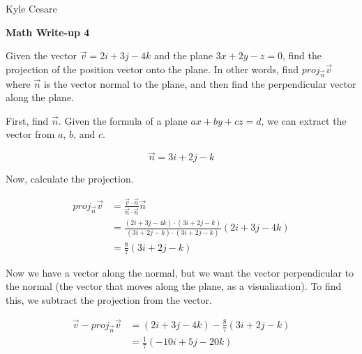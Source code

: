 \documentclass[11pt]{article}
\begin{document}
\begin{flushright}
  Kyle Cesare
\end{flushright}

{\center \textbf{Math Write-up 4} \\}

Given the vector $\vec v = 2i + 3j - 4k$ and the plane $3x + 2y - z = 0$, find
the projection of the position vector onto the plane.  In other words, find
$proj_{\vec n} \vec v$ where $\vec n$ is the vector normal to the plane, and
then find the perpendicular vector along the plane.

First, find $\vec n$.  Given the formula of a plane $ax + by + cz = d$, we can
extract the vector from $a$, $b$, and $c$.

$$
  \vec n = 3i + 2j - k
$$

Now, calculate the projection.

\begin{align*}
  proj_{\vec n} \vec v &= \frac{\vec v \cdot \vec n}{\vec n \cdot \vec n} \vec n \\
                       &= \frac{(2i + 3j - 4k) \cdot (3i + 2j - k)}{(3i + 2j -
                          k) \cdot (3i + 2j - k)}(2i + 3j - 4k) \\
                       &= \frac{8}{7}(3i + 2j - k)
\end{align*}

Now we have a vector along the normal, but we want the vector perpendicular to
the normal (the vector that moves along the plane, as a visualization).  To find
this, we subtract the projection from the vector.

\begin{align*}
  \vec v - proj_{\vec n} \vec v &= (2i + 3j - 4k) - \frac{8}{7}(3i + 2j - k) \\
                                &= \frac{1}{7}(-10i + 5j - 20k)
\end{align*}
\end{document}
